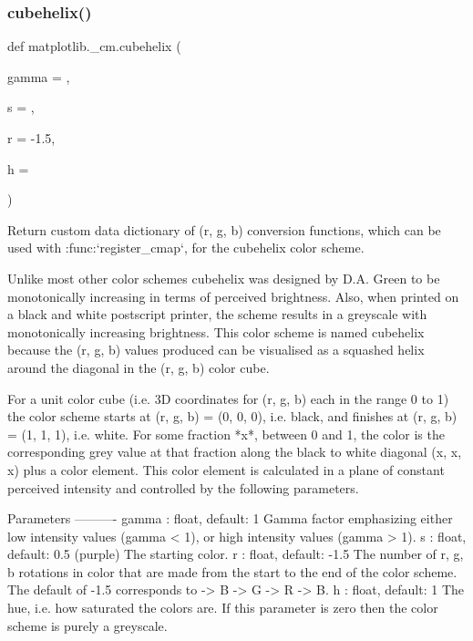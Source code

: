 \subsubsection{\texorpdfstring{cubehelix()}{cubehelix()}}
{\footnotesize\ttfamily def matplotlib.\+\_\+cm.\+cubehelix (\begin{DoxyParamCaption}\item[{}]{gamma = {},  }\item[{}]{s = {},  }\item[{}]{r = {\ttfamily -\/1.5},  }\item[{}]{h = {} }\end{DoxyParamCaption})}

\begin{DoxyVerb}Return custom data dictionary of (r, g, b) conversion functions, which can
be used with :func:`register_cmap`, for the cubehelix color scheme.

Unlike most other color schemes cubehelix was designed by D.A. Green to
be monotonically increasing in terms of perceived brightness.
Also, when printed on a black and white postscript printer, the scheme
results in a greyscale with monotonically increasing brightness.
This color scheme is named cubehelix because the (r, g, b) values produced
can be visualised as a squashed helix around the diagonal in the
(r, g, b) color cube.

For a unit color cube (i.e. 3D coordinates for (r, g, b) each in the
range 0 to 1) the color scheme starts at (r, g, b) = (0, 0, 0), i.e. black,
and finishes at (r, g, b) = (1, 1, 1), i.e. white. For some fraction *x*,
between 0 and 1, the color is the corresponding grey value at that
fraction along the black to white diagonal (x, x, x) plus a color
element. This color element is calculated in a plane of constant
perceived intensity and controlled by the following parameters.

Parameters
----------
gamma : float, default: 1
    Gamma factor emphasizing either low intensity values (gamma < 1), or
    high intensity values (gamma > 1).
s : float, default: 0.5 (purple)
    The starting color.
r : float, default: -1.5
    The number of r, g, b rotations in color that are made from the start
    to the end of the color scheme.  The default of -1.5 corresponds to ->
    B -> G -> R -> B.
h : float, default: 1
    The hue, i.e. how saturated the colors are. If this parameter is zero
    then the color scheme is purely a greyscale.
\end{DoxyVerb}
 

